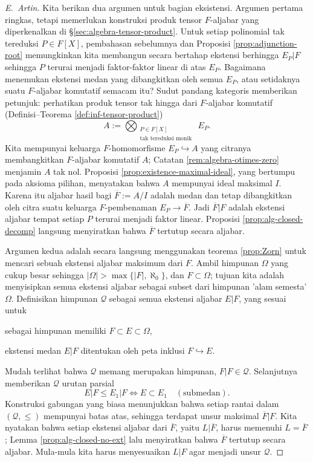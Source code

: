 \begin{proof}[E.\ Artin]
	Kita berikan dua argumen untuk bagian eksistensi. Argumen pertama ringkas, tetapi memerlukan konstruksi produk tensor $F$-aljabar yang diperkenalkan di \S\ref{sec:algebra-tensor-product}. Untuk setiap polinomial tak tereduksi $P \in F[X]$, pembahasan sebelumnya dan Proposisi \ref{prop:adjunction-root} memungkinkan kita membangun secara bertahap ekstensi berhingga $E_P|F$ sehingga $P$ terurai menjadi faktor-faktor linear di atas $E_P$. Bagaimana menemukan ekstensi medan yang dibangkitkan oleh semua $E_P$, atau setidaknya suatu $F$-aljabar komutatif semacam itu? Sudut pandang kategoris memberikan petunjuk: perhatikan produk tensor tak hingga dari $F$-aljabar komutatif (Definisi--Teorema \ref{def:inf-tensor-product})
	\[ A := \bigotimes_{\substack{P \in F[X] \\ \text{tak tereduksi monik } }} E_P. \]
	Kita mempunyai keluarga $F$-homomorfisme $E_P \hookrightarrow A$ yang citranya membangkitkan $F$-aljabar komutatif $A$; Catatan \ref{rem:algebra-otimes-zero} menjamin $A$ tak nol. Proposisi \ref{prop:existence-maximal-ideal}, yang bertumpu pada aksioma pilihan, menyatakan bahwa $A$ mempunyai ideal maksimal $I$. Karena itu aljabar hasil bagi $\overline{F} := A/I$ adalah medan dan tetap dibangkitkan oleh citra suatu keluarga $F$-pembenaman $E_P \to \overline{F}$. Jadi $\overline{F}|F$ adalah ekstensi aljabar tempat setiap $P$ terurai menjadi faktor linear. Proposisi \ref{prop:alg-closed-decomp} langsung menyiratkan bahwa $\overline{F}$ tertutup secara aljabar.
	
	Argumen kedua adalah secara langsung menggunakan teorema \ref{prop:Zorn} untuk mencari sebuah ekstensi aljabar maksimum dari $F$. Ambil himpunan $\Omega$ yang cukup besar sehingga $|\Omega| > \max\{|F|, \aleph_0\}$, dan $F \subset \Omega$; tujuan kita adalah menyisipkan semua ekstensi aljabar sebagai subset dari himpunan 'alam semesta' $\Omega$. Definisikan himpunan $\mathcal{Q}$ sebagai semua ekstensi aljabar $E|F$, yang sesuai untuk
	\begin{inparaenum}[(i)]
		\item sebagai himpunan memiliki $F \subset E \subset \Omega$,
		\item ekstensi medan $E|F$ ditentukan oleh peta inklusi $F \hookrightarrow E$.
	\end{inparaenum}
	Mudah terlihat bahwa $\mathcal{Q}$ memang merupakan himpunan, $F|F \in \mathcal{Q}$. Selanjutnya memberikan $\mathcal{Q}$ urutan parsial
	\[ E|F \leq E_1|F \iff E \subset E_1 \quad (\text{submedan}). \]
	Konstruksi gabungan yang biasa menunjukkan bahwa setiap rantai dalam $(\mathcal{Q}, \leq)$ mempunyai batas atas, sehingga terdapat unsur maksimal $\overline{F}|F$. Kita nyatakan bahwa setiap ekstensi aljabar dari $\overline{F}$, yaitu $L|\overline{F}$, harus memenuhi $L=\overline{F}$; Lemma \ref{prop:alg-closed-no-ext} lalu menyiratkan bahwa $\overline{F}$ tertutup secara aljabar. Mula-mula kita harus menyesuaikan $L|F$ agar menjadi unsur $\mathcal{Q}$.
	

\end{proof}
